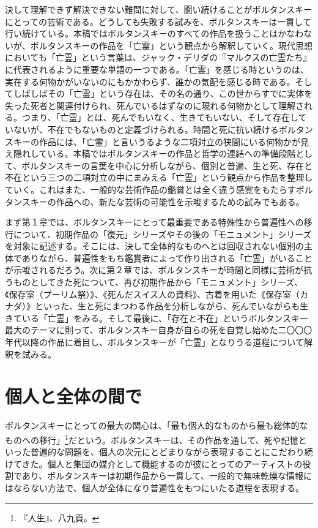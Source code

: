 \documentclass[b5j,twoside,twocolumn]{utarticle}
\begin{document}
決して理解できず解決できない難問に対して、闘い続けることがボルタンスキーにとっての芸術である。どうしても失敗する試みを、ボルタンスキーは一貫して行い続けている。本稿ではボルタンスキーのすべての作品を扱うことはかなわないが、ボルタンスキーの作品を「亡霊」という観点から解釈していく。現代思想においても「亡霊」という言葉は、ジャック・デリダの『マルクスの亡霊たち』に代表されるように重要な単語の一つである。「亡霊」を感じる時というのは、実在する何物かがいないのにもかかわらず、誰かの気配を感じる時である。そしてしばしばその「亡霊」という存在は、その名の通り、この世からすでに実体を失った死者と関連付けられ、死んでいるはずなのに現れる何物かとして理解される。つまり、「亡霊」とは、死んでもいなく、生きてもいない、そして存在していないが、不在でもないものと定義づけられる。時間と死に抗い続けるボルタンスキーの作品には、「亡霊」と言いうるような二項対立の狭間にいる何物かが見え隠れしている。本稿ではボルタンスキーの作品と哲学の連結への準備段階として、ボルタンスキーの言葉を中心に分析しながら、個別と普遍、生と死、存在と不在という三つの二項対立の中にまみえる「亡霊」という観点から作品を整理していく。これはまた、一般的な芸術作品の鑑賞とは全く違う感覚をもたらすボルタンスキーの作品への、新たな芸術の可能性を示唆するための試みでもある。


まず第１章では、ボルタンスキーにとって最重要である特殊性から普遍性への移行について、初期作品の「復元」シリーズやその後の「モニュメント」シリーズを対象に記述する。そこには、決して全体的なものへとは回収されない個別の主体でありながら、普遍性をもち鑑賞者によって作り出される「亡霊」がいることが示唆されるだろう。次に第２章では、ボルタンスキーが時間と同様に芸術が抗うものとしてきた死について、再び初期作品から「モニュメント」シリーズ、《保存室（プーリム祭）》、《死んだスイス人の資料》、古着を用いた《保存室（カナダ）》といった、生と死にまつわる作品を分析しながら、死んでいながらも生きている「亡霊」をみる。そして最後に、「存在と不在」というボルタンスキー最大のテーマに則って、ボルタンスキー自身が自らの死を自覚し始めた二〇〇〇年代以降の作品に着目し、ボルタンスキーが「亡霊」となりうる道程について解釈を試みる。


\section{個人と全体の間で}
ボルタンスキーにとっての最大の関心は、「最も個人的なものから最も総体的なものへの移行」\footnote{『人生』、八九頁。}だという。ボルタンスキーは、その作品を通して、死や記憶といった普遍的な問題を、個人の次元にとどまりながら表現することにこだわり続けてきた。個人と集団の媒介として機能するのが彼にとってのアーティストの役割であり、ボルタンスキーは初期作品から一貫して、一般的で無味乾燥な情報にはならない方法で、個人が全体になり普遍性をもつにいたる道程を表現する。
\end{document}
